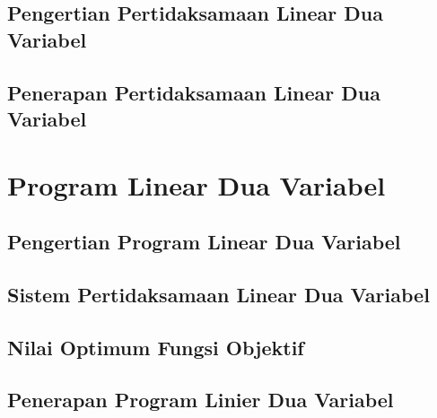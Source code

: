 \documentclass[11pt,fleqn]{book} %
\begin{document}
\section{Pengertian Pertidaksamaan Linear Dua Variabel}

\section{Penerapan Pertidaksamaan Linear Dua Variabel}



\chapter{Program Linear Dua Variabel}

\section{Pengertian Program Linear Dua Variabel}

\section{Sistem Pertidaksamaan Linear Dua Variabel}

\section{Nilai Optimum Fungsi Objektif}

\section{Penerapan Program Linier Dua Variabel}


\end{document}
